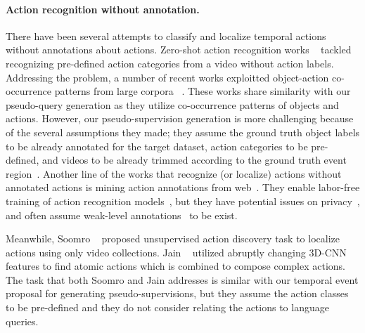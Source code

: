 \vspace{-1em}\paragraph{Action recognition without annotation.}
There have been several attempts to classify and localize temporal actions without annotations about actions.
Zero-shot action recognition works \etal~\cite{jain2015objects2action,Demirel_2017_ICCV,xu2017transductive,junyu2019AAAI_TS-GCN,dixit2019semantic} tackled recognizing pre-defined action categories from a video without action labels. Addressing the problem, a number of recent works exploitted object-action co-occurrence patterns from large corpora ~\cite{jain2015objects2action,Demirel_2017_ICCV,dixit2019semantic}. 
These works share similarity with our pseudo-query generation as they utilize co-occurrence patterns of objects and actions. However, our pseudo-supervision generation is more challenging because of the several assumptions they made; they assume the ground truth object labels to be already annotated for the target dataset, action categories to be pre-defined, and videos to be already trimmed according to the ground truth event region~\cite{Demirel_2017_ICCV,dixit2019semantic}.
%
Another line of the works that recognize (or localize) actions without annotated actions is mining action annotations from web~\cite{chesneau2017learning,gan2016webly,Yeung_2017_CVPR,Gan_2016_CVPR,Sultani_2016_CVPR,sun2015temporal}. 
They enable labor-free training of action recognition models~\cite{Gan_2016_CVPR}, but they have potential issues on privacy~\cite{fan2019practical,tonge2016image}, and often assume weak-level annotations~\cite{Sultani_2016_CVPR,sun2015temporal} to be exist.

Meanwhile, Soomro \etal~\cite{Soomro2017UnsupervisedAD} proposed unsupervised action discovery task to localize actions using only video collections. Jain \etal~\cite{jain2020actionbytes} utilized abruptly changing 3D-CNN features to find atomic actions which is combined to compose complex actions. The task that both Soomro \etal and Jain \etal addresses is similar with our temporal event proposal for generating pseudo-supervisions, but they assume the action classes to be pre-defined and they do not consider relating the actions to language queries.


